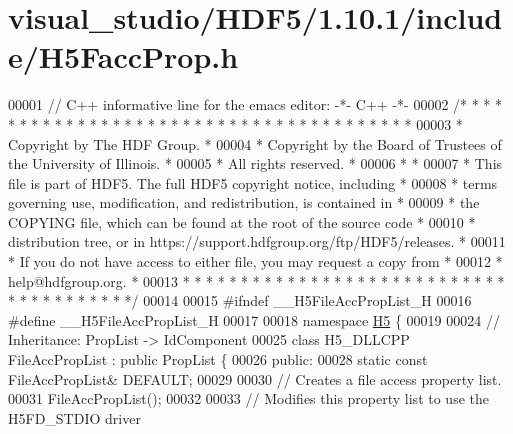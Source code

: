 \hypertarget{visual__studio_2_h_d_f5_21_810_81_2include_2_h5_facc_prop_8h_source}{}\section{visual\+\_\+studio/\+H\+D\+F5/1.10.1/include/\+H5\+Facc\+Prop.h}
\label{visual__studio_2_h_d_f5_21_810_81_2include_2_h5_facc_prop_8h_source}

\begin{DoxyCode}
00001 \textcolor{comment}{// C++ informative line for the emacs editor: -*- C++ -*-}
00002 \textcolor{comment}{/* * * * * * * * * * * * * * * * * * * * * * * * * * * * * * * * * * * * * * *}
00003 \textcolor{comment}{ * Copyright by The HDF Group.                                               *}
00004 \textcolor{comment}{ * Copyright by the Board of Trustees of the University of Illinois.         *}
00005 \textcolor{comment}{ * All rights reserved.                                                      *}
00006 \textcolor{comment}{ *                                                                           *}
00007 \textcolor{comment}{ * This file is part of HDF5.  The full HDF5 copyright notice, including     *}
00008 \textcolor{comment}{ * terms governing use, modification, and redistribution, is contained in    *}
00009 \textcolor{comment}{ * the COPYING file, which can be found at the root of the source code       *}
00010 \textcolor{comment}{ * distribution tree, or in https://support.hdfgroup.org/ftp/HDF5/releases.  *}
00011 \textcolor{comment}{ * If you do not have access to either file, you may request a copy from     *}
00012 \textcolor{comment}{ * help@hdfgroup.org.                                                        *}
00013 \textcolor{comment}{ * * * * * * * * * * * * * * * * * * * * * * * * * * * * * * * * * * * * * * */}
00014 
00015 \textcolor{preprocessor}{#ifndef \_\_H5FileAccPropList\_H}
00016 \textcolor{preprocessor}{#define \_\_H5FileAccPropList\_H}
00017 
00018 \textcolor{keyword}{namespace }\hyperlink{namespace_h5}{H5} \{
00019 
00024 \textcolor{comment}{//  Inheritance: PropList -> IdComponent}
00025 \textcolor{keyword}{class }H5\_DLLCPP FileAccPropList : \textcolor{keyword}{public} PropList \{
00026    \textcolor{keyword}{public}:
00028         \textcolor{keyword}{static} \textcolor{keyword}{const} FileAccPropList& DEFAULT;
00029 
00030         \textcolor{comment}{// Creates a file access property list.}
00031         FileAccPropList();
00032 
00033         \textcolor{comment}{// Modifies this property list to use the H5FD\_STDIO driver}

\end{DoxyCode}
